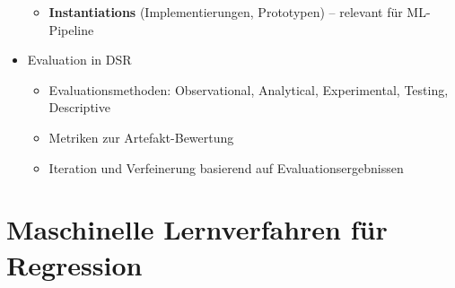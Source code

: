 \begin{itemize}
\begin{itemize}
    \item \textbf{Instantiations} (Implementierungen, Prototypen) -- relevant für ML-Pipeline
  \end{itemize}
  \item Evaluation in DSR
  \begin{itemize}
    \item Evaluationsmethoden: Observational, Analytical, Experimental, Testing, Descriptive
    \item Metriken zur Artefakt-Bewertung
    \item Iteration und Verfeinerung basierend auf Evaluationsergebnissen
  \end{itemize}
\end{itemize}


\section{Maschinelle Lernverfahren für Regression}
